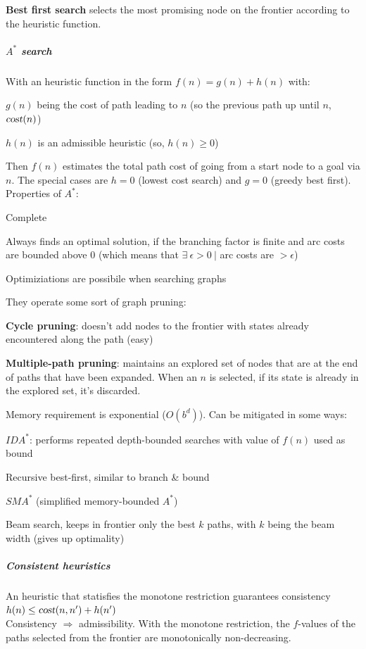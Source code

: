 \documentclass[10pt]{report}
\begin{document}
\textbf{Best first search} selects the most promising node on the frontier according to the heuristic function.
\subparagraph{$A^*$ search} With an heuristic function in the form $f(n) = g(n) + h(n)$ with:
\begin{list}{}{}
	\item $g(n)$ being the cost of path leading to $n$ (so the previous path up until $n$, $\textsl{cost}(n)$)
	\item $h(n)$ is an admissible heuristic (so, $h(n) \geq 0$)
\end{list}
Then $f(n)$ estimates the total path cost of going from a start node to a goal via $n$. The special cases are $h = 0$ (lowest cost search) and $g = 0$ (greedy best first).\\
Properties of $A^*$:\begin{list}{}{}
	\item Complete
	\item Always finds an optimal solution, if the branching factor is finite and arc costs are bounded above 0 (which means that $\exists\:\epsilon > 0\:|$ arc costs are $> \epsilon$)
	\item Optimiziations are possibile when searching graphs
	\item They operate some sort of graph pruning:
	\begin{list}{}{}
		\item \textbf{Cycle pruning}: doesn't add nodes to the frontier with states already encountered along the path (easy)
		\item \textbf{Multiple-path pruning}: maintains an explored set of nodes that are at the end of paths that have been expanded. When an $n$ is selected, if its state is already in the explored set, it's discarded.
	\end{list}
	\item Memory requirement is exponential ($O(b^d)$). Can be mitigated in some ways:
	\begin{list}{}{}
		\item $IDA^*$: performs repeated depth-bounded searches with value of $f(n)$ used as bound
		\item Recursive best-first, similar to branch \& bound
		\item $SMA^*$ (simplified memory-bounded $A^*$)
		\item Beam search, keeps in frontier only the best $k$ paths, with $k$ being the beam width (gives up optimality)
	\end{list}
\end{list}
\subparagraph{Consistent heuristics} An heuristic that statisfies the monotone restriction guarantees consistency $h(n) \leq \textsl{cost}(n, n') + h(n')$\\
Consistency $\Rightarrow$ admissibility. With the monotone restriction, the $f$-values of the paths selected from the frontier are monotonically non-decreasing.
\end{document}
